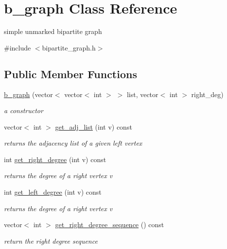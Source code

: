 \hypertarget{classb__graph}{}\section{b\+\_\+graph Class Reference}
\label{classb__graph}


simple unmarked bipartite graph  




{\ttfamily \#include $<$bipartite\+\_\+graph.\+h$>$}

\subsection*{Public Member Functions}
\begin{DoxyCompactItemize}
\item 
\hyperlink{classb__graph_a6032fbf9681d275260dd9a8587447e61}{b\+\_\+graph} (vector$<$ vector$<$ int $>$ $>$ list, vector$<$ int $>$ right\+\_\+deg)
\begin{DoxyCompactList}\small\item\em a constructor \end{DoxyCompactList}\item 
vector$<$ int $>$ \hyperlink{classb__graph_aa81c7179b9c6cb4986c4b41e84a85799}{get\+\_\+adj\+\_\+list} (int v) const
\begin{DoxyCompactList}\small\item\em returns the adjacency list of a given left vertex \end{DoxyCompactList}\item 
int \hyperlink{classb__graph_a1caf2e1ca8ee19e7407f489be6b171b8}{get\+\_\+right\+\_\+degree} (int v) const
\begin{DoxyCompactList}\small\item\em returns the degree of a right vertex v \end{DoxyCompactList}\item 
int \hyperlink{classb__graph_ac64ac5cb1197d8008e07babc333eb3ea}{get\+\_\+left\+\_\+degree} (int v) const
\begin{DoxyCompactList}\small\item\em returns the degree of a right vertex v \end{DoxyCompactList}\item 
vector$<$ int $>$ \hyperlink{classb__graph_a2711566385b92b02f4c03abdc1f9a582}{get\+\_\+right\+\_\+degree\+\_\+sequence} () const
\begin{DoxyCompactList}\small\item\em return the right degree sequence \end{DoxyCompactList}\item 

\end{DoxyCompactItemize}
